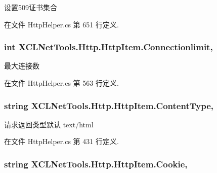 设置509证书集合 



在文件 Http\-Helper.\-cs 第 651 行定义.

\hypertarget{class_x_c_l_net_tools_1_1_http_1_1_http_item_aec31f6a1aee8eb9db56ac8f606577b50}{
\subsubsection[{Connectionlimit}]{\setlength{\rightskip}{0pt plus 5cm}int X\-C\-L\-Net\-Tools.\-Http.\-Http\-Item.\-Connectionlimit\hspace{0.3cm}{\ttfamily [get]}, {\ttfamily [set]}}}\label{class_x_c_l_net_tools_1_1_http_1_1_http_item_aec31f6a1aee8eb9db56ac8f606577b50}


最大连接数 



在文件 Http\-Helper.\-cs 第 563 行定义.

\hypertarget{class_x_c_l_net_tools_1_1_http_1_1_http_item_a9eb33692e42e8900e183f3230f1f25d0}{
\subsubsection[{Content\-Type}]{\setlength{\rightskip}{0pt plus 5cm}string X\-C\-L\-Net\-Tools.\-Http.\-Http\-Item.\-Content\-Type\hspace{0.3cm}{\ttfamily [get]}, {\ttfamily [set]}}}\label{class_x_c_l_net_tools_1_1_http_1_1_http_item_a9eb33692e42e8900e183f3230f1f25d0}


请求返回类型默认 text/html 



在文件 Http\-Helper.\-cs 第 431 行定义.

\hypertarget{class_x_c_l_net_tools_1_1_http_1_1_http_item_af2eceddbe3b702399d4a13369207f5f6}{
\subsubsection[{Cookie}]{\setlength{\rightskip}{0pt plus 5cm}string X\-C\-L\-Net\-Tools.\-Http.\-Http\-Item.\-Cookie\hspace{0.3cm}{\ttfamily [get]}, {\ttfamily [set]}}}\label{class_x_c_l_net_tools_1_1_http_1_1_http_item_af2eceddbe3b702399d4a13369207f5f6}


